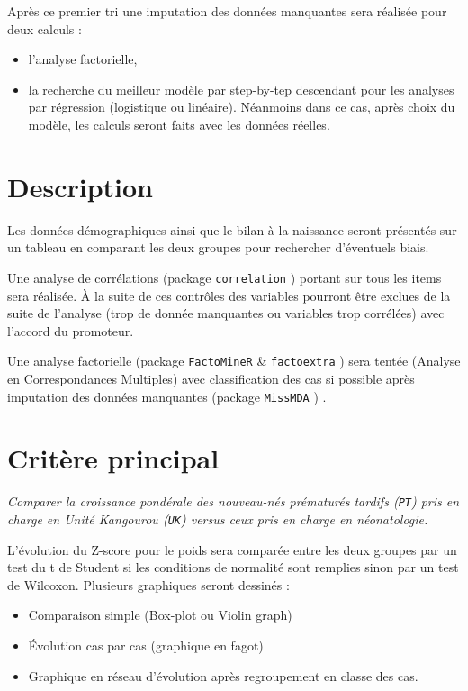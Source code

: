 \documentclass[
  10 pt,
  a4paperpaper,
  french]{scrartcl}
\providecommand{\tightlist}{%
  \setlength{\itemsep}{0pt}\setlength{\parskip}{0pt}}\usepackage{longtable,booktabs,array}
\begin{document}
Après ce premier tri une imputation des données manquantes sera réalisée
pour deux calculs :

\begin{itemize}
\tightlist
\item
  l'analyse factorielle,
\item
  la recherche du meilleur modèle par step-by-tep descendant pour les
  analyses par régression (logistique ou linéaire). Néanmoins dans ce
  cas, après choix du modèle, les calculs seront faits avec les données
  réelles.
\end{itemize}

\hypertarget{description}{%
\section{Description}\label{description}}

Les données démographiques ainsi que le bilan à la naissance seront
présentés sur un tableau en comparant les deux groupes pour rechercher
d'éventuels biais.

Une analyse de corrélations (package \texttt{correlation} \citep{corr})
portant sur tous les items sera réalisée. À la suite de ces contrôles
des variables pourront être exclues de la suite de l'analyse (trop de
donnée manquantes ou variables trop corrélées) avec l'accord du
promoteur.

Une analyse factorielle (package \texttt{FactoMineR} \citep{facto} \&
\texttt{factoextra} \citep{fextra}) sera tentée (Analyse en
Correspondances Multiples) avec classification des cas si possible après
imputation des données manquantes (package \texttt{MissMDA}
\citep{missm}) .

\hypertarget{crituxe8re-principal}{%
\section{Critère principal}\label{crituxe8re-principal}}

\emph{Comparer la croissance pondérale des nouveau-nés prématurés
tardifs (\texttt{PT}) pris en charge en Unité Kangourou (\texttt{UK})
versus ceux pris en charge en néonatologie.}

L'évolution du Z-score pour le poids sera comparée entre les deux
groupes par un test du t de Student si les conditions de normalité sont
remplies sinon par un test de Wilcoxon. Plusieurs graphiques seront
dessinés :

\begin{itemize}
\tightlist
\item
  Comparaison simple (Box-plot ou Violin graph)
\item
  Évolution cas par cas (graphique en fagot)
\item
  Graphique en réseau d'évolution après regroupement en classe des cas.
\end{itemize}
\end{document}
